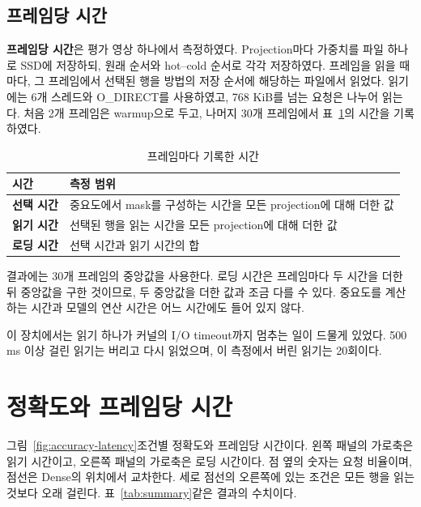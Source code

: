 \subsection{프레임당 시간}\label{sec:exp-time}

\textbf{프레임당 시간}은 평가 영상 하나에서 측정하였다. Projection마다 가중치를 파일 하나로 SSD에 저장하되, 원래 순서와 hot--cold 순서로 각각 저장하였다. 프레임을 읽을 때마다, 그 프레임에서 선택된 행을 방법의 저장 순서에 해당하는 파일에서 읽었다. 읽기에는 6개 스레드와 O\_DIRECT를 사용하였고, 768 KiB를 넘는 요청은 나누어 읽는다. 처음 2개 프레임은 warmup으로 두고, 나머지 30개 프레임에서 표~\ref{tab:times}의 시간을 기록하였다.

\begin{table}[htbp]
    \centering
    \caption{프레임마다 기록한 시간}
    \label{tab:times}
    \begin{tabular}{ll}
        \toprule
        시간 & 측정 범위 \\
        \midrule
        \textbf{선택 시간} & 중요도에서 mask를 구성하는 시간을 모든 projection에 대해 더한 값 \\
        \textbf{읽기 시간} & 선택된 행을 읽는 시간을 모든 projection에 대해 더한 값 \\
        \textbf{로딩 시간} & 선택 시간과 읽기 시간의 합 \\
        \bottomrule
    \end{tabular}
\end{table}

결과에는 30개 프레임의 중앙값을 사용한다. 로딩 시간은 프레임마다 두 시간을 더한 뒤 중앙값을 구한 것이므로, 두 중앙값을 더한 값과 조금 다를 수 있다. 중요도를 계산하는 시간과 모델의 연산 시간은 어느 시간에도 들어 있지 않다.

이 장치에서는 읽기 하나가 커널의 I/O timeout까지 멈추는 일이 드물게 있었다. 500 ms 이상 걸린 읽기는 버리고 다시 읽었으며, 이 측정에서 버린 읽기는 20회이다.

\section{정확도와 프레임당 시간}\label{sec:exp-results}

그림~\ref{fig:accuracy-latency}\은 조건별 정확도와 프레임당 시간이다. 왼쪽 패널의 가로축은 읽기 시간이고, 오른쪽 패널의 가로축은 로딩 시간이다. 점 옆의 숫자는 요청 비율이며, 점선은 Dense의 위치에서 교차한다. 세로 점선의 오른쪽에 있는 조건은 모든 행을 읽는 것보다 오래 걸린다. 표~\ref{tab:summary}\는 같은 결과의 수치이다.

